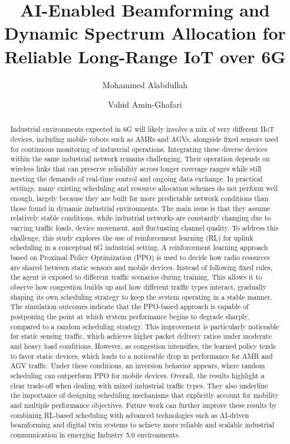 \documentclass[number]{autarticle}
\begin{document}
\begin{frontmatter}

\title{AI-Enabled Beamforming and Dynamic Spectrum Allocation for Reliable Long-Range IoT over 6G}

\author{Mohammed Alabdullah}
\author{Vahid Amin-Ghafari}
\address[add1]{Iran University of Science and Technology, Computer Networks Engineering, Tehran, Iran}

\begin{abstract}
    Industrial environments expected in 6G will likely involve a mix of very different IIoT devices, including mobile robots such as AMRs and AGVs, alongside fixed sensors used for continuous monitoring of industrial operations. Integrating these diverse devices within the same industrial network remains challenging. Their operation depends on wireless links that can preserve reliability across longer coverage ranges while still meeting the demands of real-time control and ongoing data exchange. In practical settings, many existing scheduling and resource allocation schemes do not perform well enough, largely because they are built for more predictable network conditions than those found in dynamic industrial environments. The main issue is that they assume relatively stable conditions, while industrial networks are constantly changing due to varying traffic loads, device movement, and fluctuating channel quality. To address this challenge, this study explores the use of reinforcement learning (RL) for uplink scheduling in a conceptual 6G industrial setting. A reinforcement learning approach based on Proximal Policy Optimization (PPO) is used to decide how radio resources are shared between static sensors and mobile devices. Instead of following fixed rules, the agent is exposed to different traffic scenarios during training. This allows it to observe how congestion builds up and how different traffic types interact, gradually shaping its own scheduling strategy to keep the system operating in a stable manner. The simulation outcomes indicate that the PPO-based approach is capable of postponing the point at which system performance begins to degrade sharply, compared to a random scheduling strategy. This improvement is particularly noticeable for static sensing traffic, which achieves higher packet delivery ratios under moderate and heavy load conditions. However, as congestion intensifies, the learned policy tends to favor static devices, which leads to a noticeable drop in performance for AMR and AGV traffic. Under these conditions, an inversion behavior appears, where random scheduling can outperform PPO for mobile devices. Overall, the results highlight a clear trade-off when dealing with mixed industrial traffic types. They also underline the importance of designing scheduling mechanisms that explicitly account for mobility and multiple performance objectives. Future work can further improve these results by combining RL-based scheduling with advanced technologies such as AI-driven beamforming and digital twin systems to achieve more reliable and scalable industrial communication in emerging Industry 5.0 environments.
    

\end{abstract}
\end{frontmatter}
\end{document}
